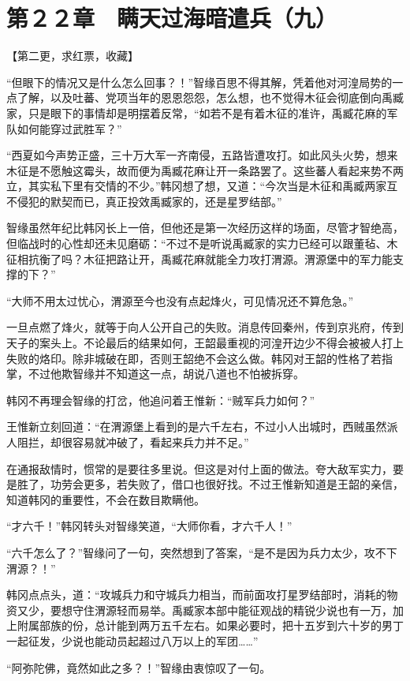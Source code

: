 \section{第２２章　瞒天过海暗遣兵（九）}

【第二更，求红票，收藏】

“但眼下的情况又是什么怎么回事？！”智缘百思不得其解，凭着他对河湟局势的一点了解，以及吐蕃、党项当年的恩恩怨怨，怎么想，也不觉得木征会彻底倒向禹臧家，只是眼下的事情却是明摆着反常，“如若不是有着木征的准许，禹臧花麻的军队如何能穿过武胜军？”

“西夏如今声势正盛，三十万大军一齐南侵，五路皆遭攻打。如此风头火势，想来木征是不愿触这霉头，故而便为禹臧花麻让开一条路罢了。这些蕃人看起来势不两立，其实私下里有交情的不少。”韩冈想了想，又道：“今次当是木征和禹臧两家互不侵犯的默契而已，真正投效禹臧家的，还是星罗结部。”

智缘虽然年纪比韩冈长上一倍，但他还是第一次经历这样的场面，尽管才智绝高，但临战时的心性却还未见磨砺：“不过不是听说禹臧家的实力已经可以跟董毡、木征相抗衡了吗？木征把路让开，禹臧花麻就能全力攻打渭源。渭源堡中的军力能支撑的下？”

“大师不用太过忧心，渭源至今也没有点起烽火，可见情况还不算危急。”

一旦点燃了烽火，就等于向人公开自己的失败。消息传回秦州，传到京兆府，传到天子的案头上。不论最后的结果如何，王韶最重视的河湟开边少不得会被被人打上失败的烙印。除非城破在即，否则王韶绝不会这么做。韩冈对王韶的性格了若指掌，不过他欺智缘并不知道这一点，胡说八道也不怕被拆穿。

韩冈不再理会智缘的打岔，他追问着王惟新：“贼军兵力如何？”

王惟新立刻回道：“在渭源堡上看到的是六千左右，不过小人出城时，西贼虽然派人阻拦，却很容易就冲破了，看起来兵力并不足。”

在通报敌情时，惯常的是要往多里说。但这是对付上面的做法。夸大敌军实力，要是胜了，功劳会更多，若失败了，借口也很好找。不过王惟新知道是王韶的亲信，知道韩冈的重要性，不会在数目欺瞒他。

“才六千！”韩冈转头对智缘笑道，“大师你看，才六千人！”

“六千怎么了？”智缘问了一句，突然想到了答案，“是不是因为兵力太少，攻不下渭源？！”

韩冈点点头，道：“攻城兵力和守城兵力相当，而前面攻打星罗结部时，消耗的物资又少，要想守住渭源轻而易举。禹臧家本部中能征观战的精锐少说也有一万，加上附属部族的份，总计能到两万五千左右。如果必要时，把十五岁到六十岁的男丁一起征发，少说也能动员起超过八万以上的军团……”

“阿弥陀佛，竟然如此之多？！”智缘由衷惊叹了一句。

